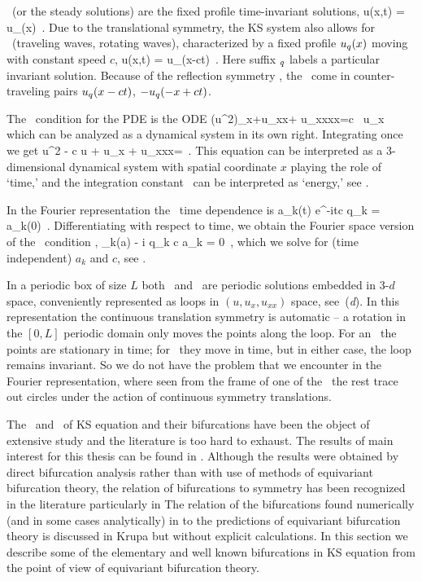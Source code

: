 \Eqva\  (or the steady solutions)
are the fixed profile time-invariant solutions,
\beq
 u(x,t) = u_\stagn(x)
\,.
Due to the translational symmetry,
the KS system also allows for
\reqva\ (traveling waves, rotating waves),
characterized by a fixed profile $u_\stagn(x)$
moving with constant speed $c$, {\ie}
\beq
 u(x,t) =  u_\stagn(x-ct)
\,.
Here suffix ${}_\stagn$ labels a particular invariant solution.
Because of the reflection symmetry ,
the \reqva\ come in counter-traveling pairs
$u_\stagn(x-ct)$, $-u_\stagn(-x+ct)$.

The \reqv\ condition for the {\KS} PDE 
is the ODE
\beq
{\textstyle{}}(u^2)_x+u_{xx}+ u_{xxxx}=c \, u_x
which can be analyzed as a dynamical system in its own right.
Integrating once we get
\beq
{\textstyle{}}u^2 - c u + u_x + u_{xxx}=\expctE
\,.
\label{eq:stdks}
\eeq
This equation can be interpreted as a 3-dimen\-si\-on\-al dynamical system
with spatial coordinate $x$ playing the role of `time,'
and the integration constant \expctE\ can be interpreted as `energy,'
see .

In the Fourier representation the \reqva\ time dependence is
\beq
 a_k(t) e^{-itc q_k} = a_k(0)
\,.
Differentiating with respect to time, we obtain
the Fourier space version of the \reqv\ condition
,
\beq
 \pVeloc_k(a) - i q_k c a_k = 0
\,,
which we solve for (time independent) $a_k$ and $c$, see .

In a periodic box of size $L$
both \eqva\ and \reqva\ are  periodic solutions
embedded in 3-$d$ space, conveniently represented as loops in
$(u,u_x,u_{xx})$ space, see \,(\textit{d}).
In this representation the continuous translation symmetry
is automatic -- a rotation in the $[0,L]$ periodic domain only
moves the points along the loop. For an \eqv\ the points
are stationary in time; for \reqv\ they move in time, but in
either case, the loop remains invariant.
So we do not have the problem that we encounter in the Fourier
representation, where seen from the frame of one of the \eqva\
the rest trace out circles under the action of continuous symmetry
translations.

The  \eqva\ and \reqva\ of KS equation and their bifurcations have been
the object of extensive study and the literature is too hard to
exhaust. The results of main interest for this thesis can be
found in .
Although the results were obtained by direct bifurcation
analysis rather than with use of methods of equivariant
bifurcation theory, the relation of bifurcations to 
symmetry has been recognized in the literature particularly in
 The relation of the bifurcations
found numerically (and in some cases analytically) in
 to the predictions of equivariant bifurcation
theory is discussed in Krupa but
without explicit calculations. In this section we describe some
of the elementary and well known bifurcations in KS equation
from the point of view of equivariant bifurcation theory.

